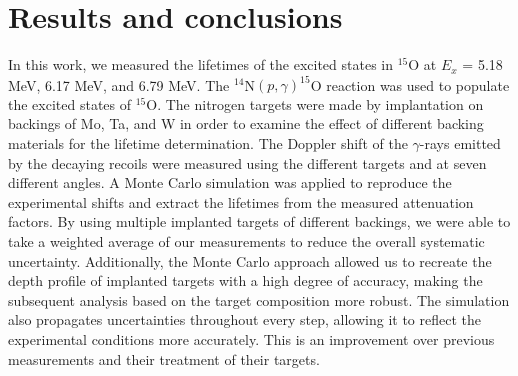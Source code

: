 %
%
%
%
%
%
%
%
%
%


%
%

\chapter{Results and conclusions}
\label{chap: conclusions}



In this work, we measured the lifetimes of the excited states in $^{15}$O at $E_{x}$ = 5.18 MeV, 6.17 MeV, and 6.79 MeV. The $^{14}$N$(p,\gamma)^{15}$O reaction was used to populate the excited states of $^{15}$O. The nitrogen targets were made by implantation on backings of Mo, Ta, and W in order to examine the effect of different backing materials for the lifetime determination. The Doppler shift of the $\gamma$-rays emitted by the decaying recoils were measured using the different targets and at seven different angles. A Monte Carlo simulation was applied to reproduce the experimental shifts and extract the lifetimes from the measured attenuation factors. By using multiple implanted targets of different backings, we were able to take a weighted average of our measurements to reduce the overall systematic uncertainty. Additionally, the Monte Carlo approach allowed us to recreate the depth profile of implanted targets with a high degree of accuracy, making the subsequent analysis based on the target composition more robust. The simulation also propagates uncertainties throughout every step, allowing it to reflect the experimental conditions more accurately. This is an improvement over previous measurements and their treatment of their targets.


